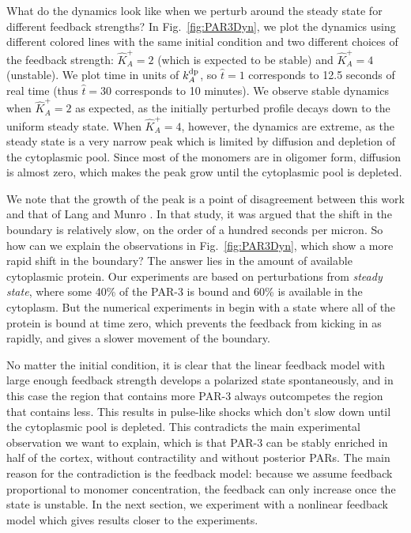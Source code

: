 \documentclass[11pt]{article}
\newcommand{\6}[1]{#1_{\text{6}}}
\newcommand{\3}[1]{#1_{\text{3}}}
\begin{document}
What do the dynamics look like when we perturb around the steady state for different feedback strengths? In Fig.\ \ref{fig:PAR3Dyn}, we plot the dynamics using different colored lines with the same initial condition and two different choices of the feedback strength: $\hat K_A^+=2$ (which is expected to be stable) and $\hat K_A^+=4$ (unstable). We plot time in units of $k^\text{dp}_A$, so $\hat t =1$ corresponds to 12.5 seconds of real time (thus $\hat t = 30$ corresponds to 10 minutes). We observe stable dynamics when $\hat K_A^+=2$ as expected, as the initially perturbed profile decays down to the uniform steady state. When $\hat K_A^+=4$, however, the dynamics are extreme, as the steady state is a very narrow peak which is limited by diffusion and depletion of the cytoplasmic pool. Since most of the monomers are in oligomer form, diffusion is almost zero, which makes the peak grow until the cytoplasmic pool is depleted.

We note that the growth of the peak is a point of disagreement between this work and that of Lang and Munro \cite{lang2022oligomerization}. In that study, it was argued that the shift in the boundary is relatively slow, on the order of a hundred seconds per micron. So how can we explain the observations in Fig.\ \ref{fig:PAR3Dyn}, which show a more rapid shift in the boundary? The answer lies in the amount of available cytoplasmic protein. Our experiments are based on perturbations from \emph{steady state}, where some 40\% of the PAR-3 is bound and 60\% is available in the cytoplasm. But the numerical experiments in \cite[Fig.~4D]{lang2022oligomerization} begin with a state where all of the protein is bound at time zero, which prevents the feedback from kicking in as rapidly, and gives a slower movement of the boundary.

No matter the initial condition, it is clear that the linear feedback model with large enough feedback strength develops a polarized state spontaneously, and in this case the region that contains more PAR-3 always outcompetes the region that contains less. This results in pulse-like shocks which don't slow down until the cytoplasmic pool is depleted. This contradicts the main experimental observation we want to explain, which is that PAR-3 can be stably enriched in half of the cortex, without contractility and without posterior PARs. The main reason for the contradiction is the feedback model: because we assume feedback proportional to monomer concentration, the feedback can only increase once the state is unstable. In the next section, we experiment with a nonlinear feedback model which gives results closer to the experiments.
\end{document}
